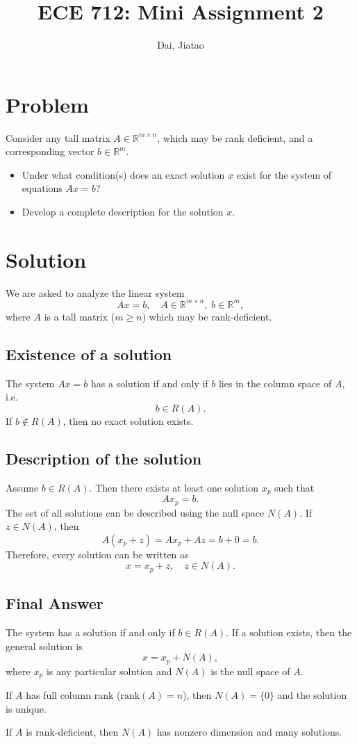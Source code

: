 \documentclass[12pt]{article}
\title{ECE 712: Mini Assignment 2}
\author{Dai, Jiatao}
\date{}
\begin{document}
\maketitle

\section*{Problem}
Consider any tall matrix $A \in \mathbb{R}^{m \times n}$, which may be rank deficient, and a corresponding vector $b \in \mathbb{R}^m$.

\begin{itemize}
    \item Under what condition(s) does an exact solution $x$ exist for the system of equations $Ax = b$?
    \item Develop a complete description for the solution $x$. 
\end{itemize}

\section*{Solution}

We are asked to analyze the linear system
\[
A x = b, \quad A \in \mathbb{R}^{m \times n}, \; b \in \mathbb{R}^m,
\]
where $A$ is a tall matrix ($m \geq n$) which may be rank-deficient.

\subsection*{Existence of a solution}
The system $Ax = b$ has a solution if and only if $b$ lies in the column space of $A$, i.e.
\[
b \in R(A).
\]
If $b \notin R(A)$, then no exact solution exists.

\subsection*{Description of the solution}
Assume $b \in R(A)$. Then there exists at least one solution $x_p$ such that
\[
A x_p = b.
\]
The set of all solutions can be described using the null space $N(A)$.  
If $z \in N(A)$, then
\[
A(x_p + z) = A x_p + A z = b + 0 = b.
\]
Therefore, every solution can be written as
\[
x = x_p + z, \quad z \in N(A).
\]

\subsection*{Final Answer}
The system has a solution if and only if $b \in R(A)$.  
If a solution exists, then the general solution is
\[
x = x_p + N(A),
\]
where $x_p$ is any particular solution and $N(A)$ is the null space of $A$.

\noindent If $A$ has full column rank ($\text{rank}(A) = n$), then $N(A) = \{0\}$ and the solution is unique.

\noindent If $A$ is rank-deficient, then $N(A)$ has nonzero dimension and many solutions.
\end{document}
